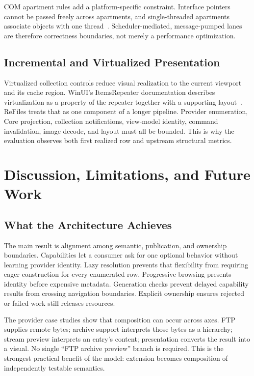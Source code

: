 \documentclass[10pt,a4paper,twoside]{article}
\begin{document}
COM apartment rules add a platform-specific constraint. Interface pointers cannot be passed freely across
apartments, and single-threaded apartments associate objects with one thread~\cite{com-sta}. Scheduler-mediated,
message-pumped lanes are therefore correctness boundaries, not merely a performance optimization.

\subsection{Incremental and Virtualized Presentation}

Virtualized collection controls reduce visual realization to the current viewport and its cache region. WinUI's
ItemsRepeater documentation describes virtualization as a property of the repeater together with a supporting
layout~\cite{winui-items-repeater}. ReFiles treats that as one component of a longer pipeline. Provider
enumeration, Core projection, collection notifications, view-model identity, command invalidation, image decode,
and layout must all be bounded. This is why the evaluation observes both first realized row and upstream
structural metrics.

\section{Discussion, Limitations, and Future Work}
\label{section:discussion}

\subsection{What the Architecture Achieves}

The main result is alignment among semantic, publication, and ownership boundaries. Capabilities let a consumer
ask for one optional behavior without learning provider identity. Lazy resolution prevents that flexibility from
requiring eager construction for every enumerated row. Progressive browsing presents identity before expensive
metadata. Generation checks prevent delayed capability results from crossing navigation boundaries. Explicit
ownership ensures rejected or failed work still releases resources.

The provider case studies show that composition can occur across axes. FTP supplies remote bytes; archive support
interprets those bytes as a hierarchy; stream preview interprets an entry's content; presentation converts the
result into a visual. No single ``FTP archive preview'' branch is required. This is the strongest practical
benefit of the model: extension becomes composition of independently testable semantics.
\end{document}
